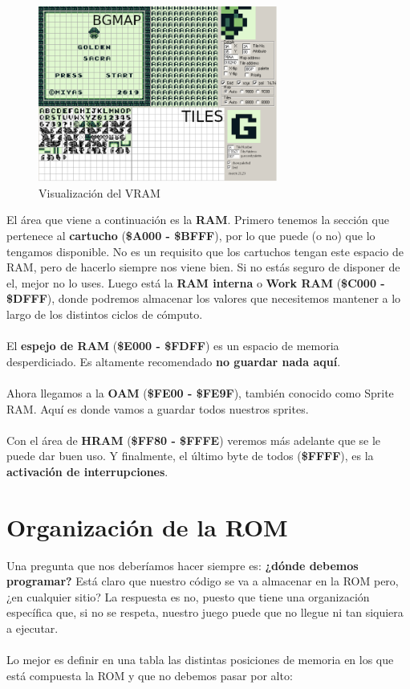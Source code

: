 \begin{figure}[h]
\centering
\includegraphics[width=0.7\textwidth]{include/images/VRAM/showbg.png}
\caption{Visualización del VRAM}
\label{figure:bgmap}
\end{figure}

El área que viene a continuación es la \textbf{RAM}. Primero tenemos la sección que pertenece al \textbf{cartucho} (\textbf{\$A000 - \$BFFF}), por lo que puede (o no) que lo tengamos disponible. No es un requisito que los cartuchos tengan este espacio de RAM, pero de hacerlo siempre nos viene bien. Si no estás seguro de disponer de el, mejor no lo uses. Luego está la \textbf{RAM interna} o \textbf{Work RAM} (\textbf{\$C000 - \$DFFF}), donde podremos almacenar los valores que necesitemos mantener a lo largo de los distintos ciclos de cómputo.
\\ \\
El \textbf{espejo de RAM} (\textbf{\$E000 - \$FDFF}) es un espacio de memoria desperdiciado. Es altamente recomendado \textbf{no guardar nada aquí}.
\\ \\
Ahora llegamos a la \textbf{OAM} (\textbf{\$FE00 - \$FE9F}), también conocido como Sprite RAM. Aquí es donde vamos a guardar todos nuestros sprites.
\\ \\
Con el área de \textbf{HRAM} (\textbf{\$FF80 - \$FFFE}) veremos más adelante que se le puede dar buen uso. Y finalmente, el último byte de todos (\textbf{\$FFFF}), es la \textbf{activación de interrupciones}.

\clearpage

\section{Organización de la ROM}

Una pregunta que nos deberíamos hacer siempre es: \textbf{¿dónde debemos programar?} Está claro que nuestro código se va a almacenar en la ROM pero, ¿en cualquier sitio? La respuesta es no, puesto que tiene una organización específica que, si no se respeta, nuestro juego puede que no llegue ni tan siquiera a ejecutar.
\\ \\
Lo mejor es definir en una tabla las distintas posiciones de memoria en los que está compuesta la ROM y que no debemos pasar por alto:

